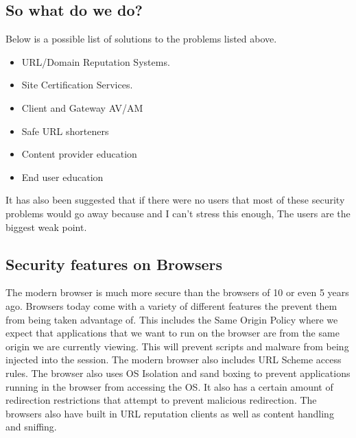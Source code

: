 \documentclass[letterpaper, onecolumn,10pt]{IEEEtran}
\begin{document}
                \subsection{So what do we do?}
                Below is a possible list of solutions to the problems listed above.
                \begin{itemize}
                    \item URL/Domain Reputation Systems.
                    \item Site Certification Services.
                    \item Client and Gateway AV/AM
                    \item Safe URL shorteners
                    \item Content provider education
                    \item End user education
                \end{itemize}
                It has also been suggested that if there were no users that most of these security problems would go away because and I can't stress this enough, The users are the biggest weak point.\\
                
                \subsection{Security features on Browsers} 
                The modern browser is much more secure than the browsers of 10 or even 5 years ago. Browsers today come with a variety of different features the prevent them from being taken advantage of. This includes the Same Origin Policy where we expect that applications that we want to run on the browser are from the same origin we are currently viewing. This will prevent scripts and malware from being injected into the session. The modern browser also includes URL Scheme access rules. The browser also uses OS Isolation and sand boxing to prevent applications running in the browser from accessing the OS. It also has a certain amount of redirection restrictions that attempt to prevent malicious redirection. The browsers also have built in URL reputation clients as well as content handling and sniffing.\\
                
\end{document}
